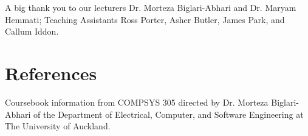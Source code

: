 \documentclass[conference]{IEEEtran}
\begin{document}
A big thank you to our lecturers Dr. Morteza Biglari-Abhari and Dr. Maryam Hemmati; Teaching Assistants Ross Porter, Asher Butler, James Park, and Callum Iddon.

\section*{References}

Coursebook information from COMPSYS 305 directed by Dr. Morteza Biglari-Abhari of the Department of Electrical, Computer, and Software Engineering at The University of Auckland.

\nocite{*}


\end{document}
